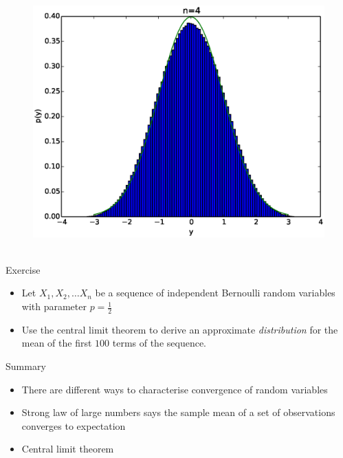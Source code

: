\documentclass{beamer}
\begin{document}
\begin{frame} 
  \begin{figure}[htp]
\mbox{
\includegraphics[width=0.5\linewidth]{clt3.eps}
}
\end{figure} 
\end{frame}

\begin{frame}{Exercise}  
\begin{itemize} 
 \item Let $X_1, X_2, \ldots X_n$ be a sequence of independent Bernoulli random variables with parameter $p = \frac{1}{2}$
 \item Use the central limit theorem to derive an approximate \emph{distribution} for the mean of the first $100$ terms of the sequence. 
\end{itemize}
 
\end{frame}


\begin{frame}{Summary} 
\begin{itemize} 
 \item There are different ways to characterise convergence of random variables 
 \item Strong law of large numbers says the sample mean of a set of observations converges to expectation 
 \item Central limit theorem 
\end{itemize}
 
\end{frame}
\end{document}
